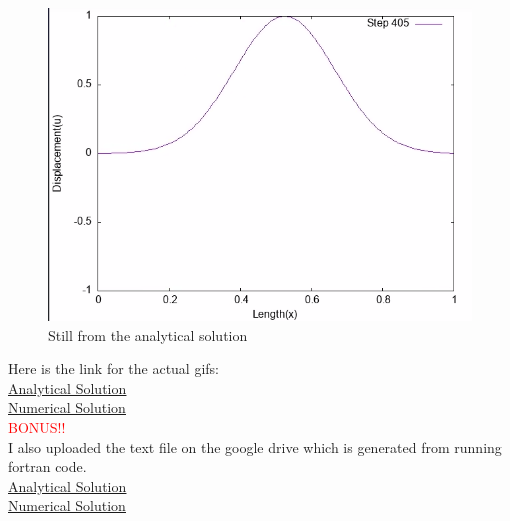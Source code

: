 \documentclass[oneside,hidelinks]{book}
\begin{document}
                                \begin{figure}[hbtp]
                                        \caption{Still from the analytical solution}
                                        \hspace*{3cm}\includegraphics[scale=0.6]{wavepulse_still_analytical.png}        
                                \end{figure}
                                
                                Here is the link for the actual gifs:\\
                                \href{https://imgur.com/a/iwEF6XL}{\underline{Analytical Solution}}\\
                                \href{https://imgur.com/a/kZL1kjg}{\underline{Numerical Solution}}\\[5pt]

                                \textcolor{red}{BONUS!!}\\
                                I also uploaded the text file on the google drive which is generated from running fortran code.\\
                                \href{https://drive.google.com/file/d/1bfo3J55lOWPwkmFMmFRtC1iScOuUE_pA/view?usp=sharing}{\underline{Analytical Solution}}\\
                                \href{https://drive.google.com/file/d/1Afp1AZzLBLb2BL8miCo2TCGyx1rZjwZ7/view?usp=sharing}{\underline{Numerical Solution}}
                  
\end{document}

